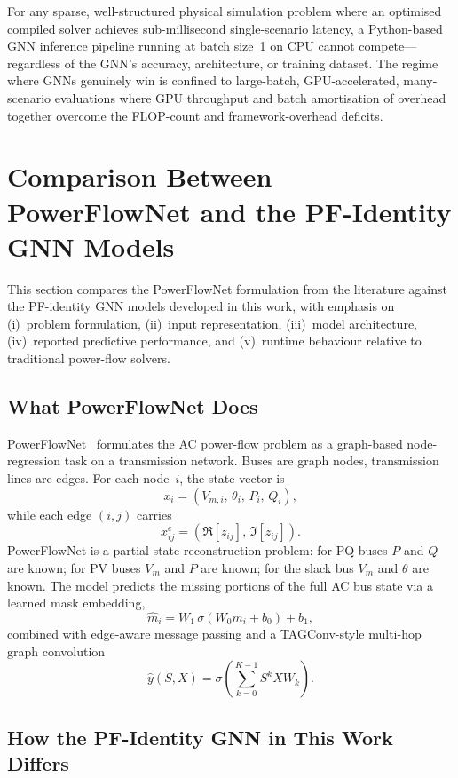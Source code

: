 \documentclass[11pt]{article}
\begin{document}
For any sparse, well-structured physical simulation problem where an
optimised compiled solver achieves sub-millisecond single-scenario latency,
a Python-based GNN inference pipeline running at batch size~1 on CPU cannot
compete---regardless of the GNN's accuracy, architecture, or training
dataset.  The regime where GNNs genuinely win is confined to large-batch,
GPU-accelerated, many-scenario evaluations where GPU throughput and batch
amortisation of overhead together overcome the FLOP-count and
framework-overhead deficits.

\section{Comparison Between PowerFlowNet and the PF-Identity GNN Models}

This section compares the PowerFlowNet formulation from the literature against the
PF-identity GNN models developed in this work, with emphasis on (i)~problem
formulation, (ii)~input representation, (iii)~model architecture,
(iv)~reported predictive performance, and (v)~runtime behaviour relative to
traditional power-flow solvers.

\subsection{What PowerFlowNet Does}

PowerFlowNet~\cite{Lin2024} formulates the AC power-flow problem as a
graph-based node-regression task on a transmission network.
Buses are graph nodes, transmission lines are edges.  For each node~$i$,
the state vector is
\[
x_i = (V_{m,i},\,\theta_i,\,P_i,\,Q_i),
\]
while each edge $(i,j)$ carries
\[
x^e_{ij} = (\Re[z_{ij}],\,\Im[z_{ij}]).
\]
PowerFlowNet is a partial-state reconstruction problem: for PQ buses $P$ and
$Q$ are known; for PV buses $V_m$ and $P$ are known; for the slack bus $V_m$
and $\theta$ are known.  The model predicts the missing portions of the full
AC bus state via a learned mask embedding,
\[
\hat m_i = W_1\,\sigma(W_0 m_i + b_0) + b_1,
\]
combined with edge-aware message passing and a TAGConv-style multi-hop
graph convolution
\[
\hat y(S,X) = \sigma\!\left(\sum_{k=0}^{K-1} S^k X W_k\right).
\]

\subsection{How the PF-Identity GNN in This Work Differs}
\end{document}
